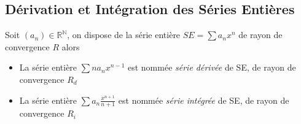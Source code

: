 \documentclass[11pt,colorlinks]{book}
\theoremstyle{mytheoremstyle}
\theoremstyle{mytheoremstyle}
\theoremstyle{mytheoremstyle}
\theoremstyle{mytheoremstyle}
\theoremstyle{mytheoremstyle}
\theoremstyle{mytheoremstyle}
\theoremstyle{mytheoremstyle}
\theoremstyle{mytheoremstyle}
\theoremstyle{myproblemstyle}
\def\mbb#1{\mathbb{#1}}
\def\bN{\mbb{N}}
\def\bR{\mbb{R}}
\def\rN{\bR^{\bN}}
\begin{document}
\subsection{Dérivation et Intégration des Séries Entières}
\begin{definition}
  Soit $(a_n) \in \rN$, on dispose de la série entière $SE = \sum a_n x^n$ de rayon de convergence $R$ alors 
  \begin{itemize}
    \item La série entière $\sum n a_n x^{n-1}$ est nommée \textit{série dérivée} de SE, de rayon de convergence $R_d$
    \item La série entière $\sum a_n \frac{x^{n+1}}{n+1}$ est nommée \textit{série intégrée} de SE, de rayon de convergence $R_i$
  \end{itemize}
\end{definition}
\end{document}
